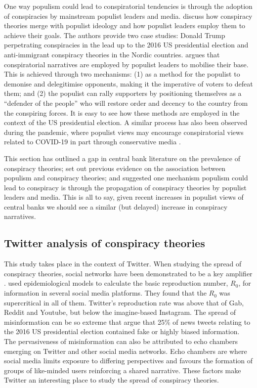 \documentclass[11pt]{article}
\begin{document}
One way populism could lead to conspiratorial tendencies is through the adoption of conspiracies by mainstream populist leaders and media. \cite{bergmann2020conspiracy} discuss how conspiracy theories merge with populist ideology and how populist leaders employ them to achieve their goals. The authors provide two case studies: Donald Trump perpetrating conspiracies in the lead up to the 2016 US presidential election and anti-immigrant conspiracy theories in the Nordic countries. \cite{sawyerpopulism} argues that conspiratorial narratives are employed by populist leaders to mobilise their base. This is achieved through two mechanisms: (1) as a method for the populist to demonise and delegitimise opponents, making it the imperative of voters to defeat them;  and (2) the populist can rally supporters by positioning themselves as a ``defender of the people'' who will restore order and decency to the country from the conspiring forces. It is easy to see how these methods are employed in the context of the US presidential election. A similar process has also been observed during the pandemic, where populist views may encourage conspiratorial views related to COVID-19 in part through conservative media \citep{stecula2021populism, eberl2021populism}.

This section has outlined a gap in central bank literature on the prevalence of conspiracy theories; set out previous evidence on the association between populism and conspiracy theories; and suggested one mechanism populism could lead to conspiracy is through the propagation of conspiracy theories by populist leaders and media. This is all to say, given recent increases in populist views of central banks we should see a similar (but delayed) increase in conspiracy narratives.

\subsection{Twitter analysis of conspiracy theories} \label{subsection: Twitter analysis of conspiracy theories}

This study takes place in the context of Twitter.  When studying the spread of conspiracy theories, social networks have been demonstrated to be a key amplifier \cite{kauk2021understanding}. \cite{cinelli2020covid} used epidemiological models to calculate the basic reproduction number, $R_0$, for information in several social media platforms. They found that the $R_0$ was supercritical in all of them. Twitter's reproduction rate was above that of Gab, Reddit and Youtube, but below the imagine-based Instagram. The spread of misinformation can be so extreme that \cite{bovet2019influence} argue that 25\% of news tweets relating to the 2016 US presidential election contained fake or highly biased information. The pervasiveness of misinformation can also be attributed to echo chambers \citep{cinelli2021echo} emerging on Twitter and other social media networks. Echo chambers are where social media limits exposure to differing perspectives and favours the formation of groups of like-minded users reinforcing a shared narrative. These factors make Twitter an interesting place to study the spread of conspiracy theories.
\end{document}
